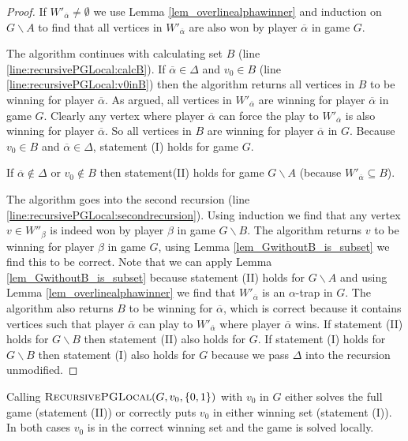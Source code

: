 \begin{theorem}
\begin{proof}
			If $W'_{\overline{\alpha}} \neq \emptyset$ we use Lemma \ref{lem_overlinealphawinner} and induction on $G\backslash A$  to find that all vertices in $W'_{\overline{\alpha}}$ are also won by player $\overline{\alpha}$ in game $G$.
			
			The algorithm continues with calculating set $B$ (line \ref{line:recursivePGLocal:calcB}). If $\overline{\alpha} \in \Delta$ and $v_0 \in B$ (line \ref{line:recursivePGLocal:v0inB}) then the algorithm returns all vertices in $B$ to be winning for player $\overline{\alpha}$. As argued, all vertices in $W'_{\overline{\alpha}}$ are winning for player $\overline{\alpha}$ in game $G$. Clearly any vertex where player $\overline{\alpha}$ can force the play to $W'_{\overline{\alpha}}$ is also winning for player $\overline{\alpha}$. So all vertices in $B$ are winning for player $\overline{\alpha}$ in $G$. Because $v_0 \in B$ and $\overline{\alpha} \in \Delta$, statement (I) holds for game $G$.
			
			If $\overline{\alpha} \notin \Delta$ or $v_0 \notin B$ then statement(II) holds for game $G\backslash A$ (because $W'_{\overline{\alpha}} \subseteq B$).
			
			The algorithm goes into the second recursion (line \ref{line:recursivePGLocal:secondrecursion}). Using induction we find that any vertex $v \in W''_\beta$ is indeed won by player $\beta$ in game $G\backslash B$. The algorithm returns $v$ to be winning for player $\beta$ in game $G$, using Lemma \ref{lem_GwithoutB_is_subset} we find this to be correct. Note that we can apply Lemma \ref{lem_GwithoutB_is_subset} because statement (II) holds for $G\backslash A$ and using Lemma \ref{lem_overlinealphawinner} we find that $W'_{\overline{\alpha}}$ is an $\alpha$-trap in $G$. The algorithm also returns $B$ to be winning for $\overline{\alpha}$, which is correct because it contains vertices such that player $\overline{\alpha}$ can play to $W'_{\overline{\alpha}}$ where player $\overline{\alpha}$ wins. If statement (II) holds for $G\backslash B$ then statement (II) also holds for $G$. If statement (I) holds for $G\backslash B$ then statement (I) also holds for $G$ because we pass $\Delta$ into the recursion unmodified.
		\end{proof}
\end{theorem}
Calling $\textsc{RecursivePGLocal}(G, v_0, \{0,1\})$ with $v_0$ in $G$ either solves the full game (statement (II)) or correctly puts $v_0$ in either winning set (statement (I)). In both cases $v_0$ is in the correct winning set and the game is solved locally.

